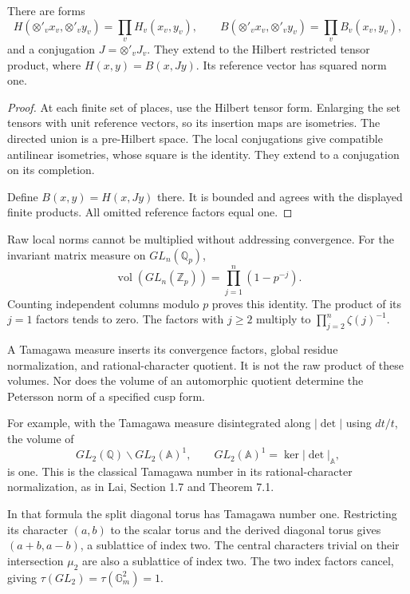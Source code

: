 \begin{proposition}
\label{v4-arith:traces:pairing-assembly}
There are forms
\[
 H(\otimes'_v x_v,\otimes'_v y_v)
     =\prod_v H_v(x_v,y_v),\qquad
 B(\otimes'_v x_v,\otimes'_v y_v)
     =\prod_v B_v(x_v,y_v),
\]
and a conjugation $J=\otimes'_v J_v$. They extend to the Hilbert restricted
tensor product, where $H(x,y)=B(x,Jy)$. Its reference vector has squared
norm one.
\end{proposition}
\begin{proof}
At each finite set of places, use the Hilbert tensor form. Enlarging the set
tensors with unit reference vectors, so its insertion maps are isometries.
The directed union is a pre-Hilbert space. The local conjugations give
compatible antilinear isometries, whose square is the identity. They extend
to a conjugation on its completion.

Define $B(x,y)=H(x,Jy)$ there. It is bounded and agrees with the displayed
finite products. All omitted reference factors equal one.
\end{proof}

Raw local norms cannot be multiplied without addressing convergence. For the
invariant matrix measure on $GL_n(\mathbb Q_p)$,
\[
 \operatorname{vol}(GL_n(\mathbb Z_p))
     =\prod_{j=1}^n(1-p^{-j}).
\]
Counting independent columns modulo $p$ proves this identity. The product of
its $j=1$ factors tends to zero. The factors with $j\geq2$ multiply to
$\prod_{j=2}^n\zeta(j)^{-1}$.

A Tamagawa measure inserts its convergence factors, global residue
normalization, and rational-character quotient. It is not the raw product of
these volumes. Nor does the volume of an automorphic quotient determine the
Petersson norm of a specified cusp form.

For example, with the Tamagawa measure disintegrated along $|\det|$ using
$dt/t$, the volume of
\[
 GL_2(\mathbb Q)\backslash GL_2(\mathbb A)^1,\qquad
 GL_2(\mathbb A)^1=\ker|\det|_{\mathbb A},
\]
is one. This is the classical Tamagawa number in its rational-character
normalization, as in Lai, Section 1.7 and Theorem 7.1.

In that formula the split diagonal torus has Tamagawa number one.
Restricting its character $(a,b)$ to the scalar torus and the derived
diagonal torus gives $(a+b,a-b)$, a sublattice of index two. The central
characters trivial on their intersection $\mu_2$ are also a sublattice of
index two. The two index factors cancel, giving $\tau(GL_2)=\tau(\mathbb
G_m^2)=1$.

